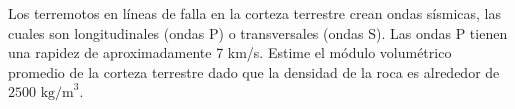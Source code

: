 \item Los terremotos en líneas de falla en la corteza terrestre crean ondas sísmicas, las cuales son longitudinales (ondas P) o transversales (ondas S). Las ondas P tienen una rapidez de aproximadamente 7 km/s. Estime el módulo volumétrico promedio de la corteza terrestre dado que la densidad de la roca es alrededor de $2500\text{ kg/m}^3$.